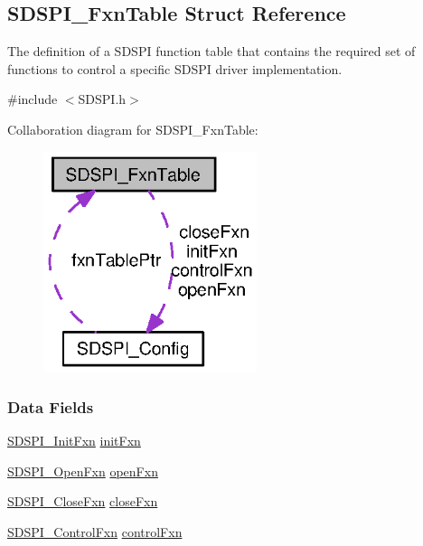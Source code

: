 \subsection{S\+D\+S\+P\+I\+\_\+\+Fxn\+Table Struct Reference}
\label{struct_s_d_s_p_i___fxn_table}


The definition of a S\+D\+S\+P\+I function table that contains the required set of functions to control a specific S\+D\+S\+P\+I driver implementation.  




{\ttfamily \#include $<$S\+D\+S\+P\+I.\+h$>$}



Collaboration diagram for S\+D\+S\+P\+I\+\_\+\+Fxn\+Table\+:
\nopagebreak
\begin{figure}[H]
\begin{center}
\leavevmode
\includegraphics[width=177pt]{struct_s_d_s_p_i___fxn_table__coll__graph}
\end{center}
\end{figure}
\subsubsection*{Data Fields}
\begin{DoxyCompactItemize}
\item 
\hyperlink{_s_d_s_p_i_8h_af13f4dd690895ef9905b94eb35186f39}{S\+D\+S\+P\+I\+\_\+\+Init\+Fxn} \hyperlink{struct_s_d_s_p_i___fxn_table_ac593f7347a7b145179fec8e4160816d2}{init\+Fxn}
\item 
\hyperlink{_s_d_s_p_i_8h_ad5e9c96037fb86b0337f0183dec6457d}{S\+D\+S\+P\+I\+\_\+\+Open\+Fxn} \hyperlink{struct_s_d_s_p_i___fxn_table_a822c1861740700d5cc489d063552e9e3}{open\+Fxn}
\item 
\hyperlink{_s_d_s_p_i_8h_a93cc6dafba2c319c8f2662c9e109f0cd}{S\+D\+S\+P\+I\+\_\+\+Close\+Fxn} \hyperlink{struct_s_d_s_p_i___fxn_table_a13d86b2434f6e60f14a3926f97101c2c}{close\+Fxn}
\item 
\hyperlink{_s_d_s_p_i_8h_a0fe214b1dedf57fb70d9c83426a4b135}{S\+D\+S\+P\+I\+\_\+\+Control\+Fxn} \hyperlink{struct_s_d_s_p_i___fxn_table_a613920b0aee49813c55c892c73d0aec0}{control\+Fxn}
\end{DoxyCompactItemize}



